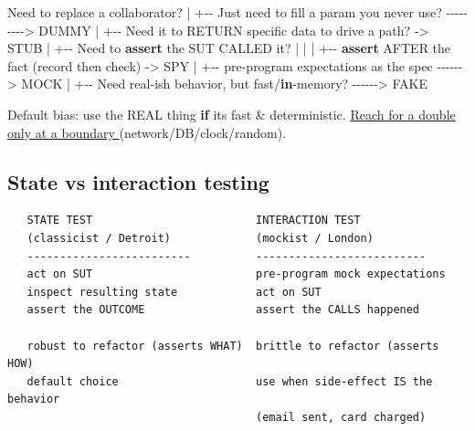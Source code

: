 \documentclass[11pt]{article}
\newenvironment{Shaded}{\begin{snugshade}}{\end{snugshade}}
\newcommand{\ControlFlowTok}[1]{\textcolor[rgb]{0.99,0.74,0.29}{\textbf{#1}}}
\newcommand{\ErrorTok}[1]{\textcolor[rgb]{0.85,0.27,0.33}{\underline{#1}}}
\newcommand{\ImportTok}[1]{\textcolor[rgb]{0.15,0.68,0.38}{#1}}
\newcommand{\KeywordTok}[1]{\textcolor[rgb]{0.81,0.81,0.76}{\textbf{#1}}}
\newcommand{\NormalTok}[1]{\textcolor[rgb]{0.81,0.81,0.76}{#1}}
\newcommand{\OperatorTok}[1]{\textcolor[rgb]{0.81,0.81,0.76}{#1}}
\newcommand{\StringTok}[1]{\textcolor[rgb]{0.96,0.31,0.31}{#1}}
\begin{document}
\begin{Shaded}
\begin{Highlighting}[]
\NormalTok{   Need to replace a collaborator?}
        \OperatorTok{|}
        \OperatorTok{+{-}{-}}\NormalTok{ Just need to fill a param you never use? }\OperatorTok{{-}{-}{-}{-}{-}{-}{-}{-}{-}\textgreater{}}\NormalTok{ DUMMY}
        \OperatorTok{|}
        \OperatorTok{+{-}{-}}\NormalTok{ Need it to RETURN specific data to drive a path? }\OperatorTok{{-}\textgreater{}}\NormalTok{ STUB}
        \OperatorTok{|}
        \OperatorTok{+{-}{-}}\NormalTok{ Need to }\ControlFlowTok{assert}\NormalTok{ the SUT CALLED it?}
        \OperatorTok{|}        \OperatorTok{|}
        \OperatorTok{|}        \OperatorTok{+{-}{-}} \ControlFlowTok{assert}\NormalTok{ AFTER the fact (record then check) }\OperatorTok{{-}\textgreater{}}\NormalTok{ SPY}
        \OperatorTok{|}        \OperatorTok{+{-}{-}}\NormalTok{ pre}\OperatorTok{{-}}\NormalTok{program expectations }\ImportTok{as}\NormalTok{ the spec }\OperatorTok{{-}{-}{-}{-}{-}{-}\textgreater{}}\NormalTok{ MOCK}
        \OperatorTok{|}
        \OperatorTok{+{-}{-}}\NormalTok{ Need real}\OperatorTok{{-}}\NormalTok{ish behavior, but fast}\OperatorTok{/}\KeywordTok{in}\OperatorTok{{-}}\NormalTok{memory? }\OperatorTok{{-}{-}{-}{-}{-}{-}\textgreater{}}\NormalTok{ FAKE}

\NormalTok{   Default bias: use the REAL thing }\ControlFlowTok{if}\NormalTok{ it}\StringTok{\textquotesingle{}s fast \& deterministic.}
\ErrorTok{   Reach for a double only at a boundary }\NormalTok{(network}\OperatorTok{/}\NormalTok{DB}\OperatorTok{/}\NormalTok{clock}\OperatorTok{/}\NormalTok{random).}
\end{Highlighting}
\end{Shaded}

\subsection{State vs interaction testing}\label{state-vs-interaction-testing}

\setcodelang{}

\begin{verbatim}
   STATE TEST                         INTERACTION TEST
   (classicist / Detroit)             (mockist / London)
   -------------------------          --------------------------
   act on SUT                         pre-program mock expectations
   inspect resulting state            act on SUT
   assert the OUTCOME                 assert the CALLS happened

   robust to refactor (asserts WHAT)  brittle to refactor (asserts HOW)
   default choice                     use when side-effect IS the behavior
                                      (email sent, card charged)
\end{verbatim}
\end{document}
